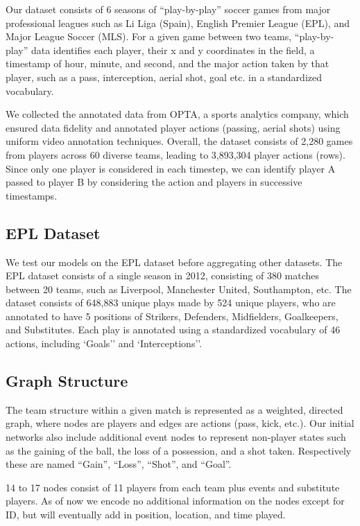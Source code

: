 Our dataset consists of 6 seasons of ``play-by-play'' soccer games from major professional leagues such as Li Liga (Spain), English Premier League (EPL), and Major League Soccer (MLS). For a given game between two teams, ``play-by-play'' data identifies each player, their x and y coordinates in the field, a timestamp of hour, minute, and second, and the major action taken by that player, such as a pass, interception, aerial shot, goal etc. in a standardized vocabulary. 

We collected the annotated data from OPTA, a sports analytics company, which ensured data fidelity and annotated player actions (passing, aerial shots) using uniform video annotation techniques. Overall, the dataset consists of 2,280 games from  players across 60 diverse teams, leading to  3,893,304 player actions (rows). Since only one player is considered in each timestep, we can identify player A passed to player B by considering the action and players in successive timestamps.  

\subsection{EPL Dataset}
We test our models on the EPL dataset before aggregating other datasets. The EPL dataset consists of a single season in 2012, consisting of 380 matches between 20 teams, such as Liverpool, Manchester United, Southampton, etc. The dataset consists of 648,883 unique plays made by 524 unique players, who are annotated to have 5 positions of Strikers, Defenders, Midfielders, Goalkeepers, and Substitutes. Each play is annotated using a standardized vocabulary of 46 actions, including `Goals'' and `Interceptions''.


\subsection{Graph Structure}
The team structure within a given match is represented as a weighted, directed graph, where nodes are players and edges are actions (pass, kick, etc.). Our initial networks also include additional event nodes to represent non-player states such as the gaining of the ball, the loss of a possession, and a shot taken. Respectively these are named ``Gain'', ``Loss'', ``Shot'', and ``Goal''. 

  14 to 17 nodes consist of 11 players from each team plus events and substitute players. As of now we encode no additional information on the nodes except for ID, but will eventually add in position, location, and time played. 

